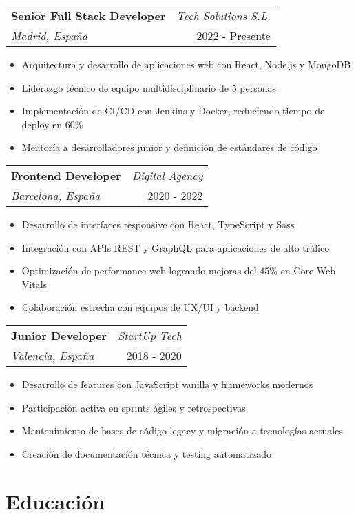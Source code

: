 \documentclass[11pt,a4paper]{article}
\newcommand{\experienciamoderna}[4]{
    \begin{tabularx}{\textwidth}{X r}
        \textbf{\color{primary}#1} & \textcolor{secondary}{\textit{#2}} \\
        \textit{\color{accent}#3} & \textcolor{secondary}{#4} \\
    \end{tabularx}
    \vspace{2pt}
}
\begin{document}
\experienciamoderna{Senior Full Stack Developer}{Tech Solutions S.L.}{Madrid, España}{2022 - Presente}
\begin{itemize}
    \item Arquitectura y desarrollo de aplicaciones web con React, Node.js y MongoDB
    \item Liderazgo técnico de equipo multidisciplinario de 5 personas
    \item Implementación de CI/CD con Jenkins y Docker, reduciendo tiempo de deploy en 60\%
    \item Mentoría a desarrolladores junior y definición de estándares de código
\end{itemize}

\vspace{10pt}

\experienciamoderna{Frontend Developer}{Digital Agency}{Barcelona, España}{2020 - 2022}
\begin{itemize}
    \item Desarrollo de interfaces responsive con React, TypeScript y Sass
    \item Integración con APIs REST y GraphQL para aplicaciones de alto tráfico
    \item Optimización de performance web logrando mejoras del 45\% en Core Web Vitals
    \item Colaboración estrecha con equipos de UX/UI y backend
\end{itemize}

\vspace{10pt}

\experienciamoderna{Junior Developer}{StartUp Tech}{Valencia, España}{2018 - 2020}
\begin{itemize}
    \item Desarrollo de features con JavaScript vanilla y frameworks modernos
    \item Participación activa en sprints ágiles y retrospectivas
    \item Mantenimiento de bases de código legacy y migración a tecnologías actuales
    \item Creación de documentación técnica y testing automatizado
\end{itemize}

\section{Educación}
\end{document}
